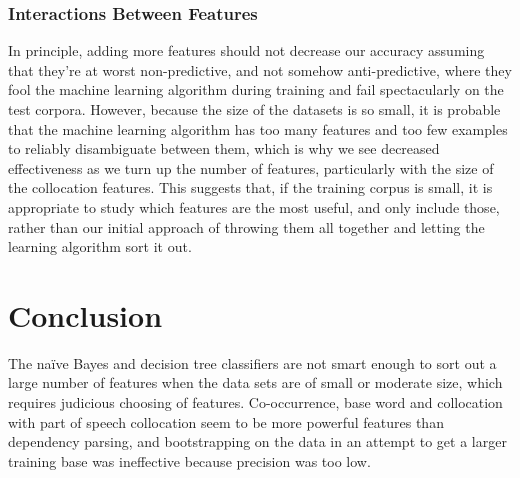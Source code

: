 \documentclass{article}
\newcommand{\naive}{na\"ive}
\begin{document}
\subsubsection{Interactions Between Features}

In principle, adding more features should not decrease our accuracy assuming
that they're at worst non-predictive, and not somehow anti-predictive, where
they fool the machine learning algorithm during training and fail spectacularly
on the test corpora.  However, because the size of the datasets is so small, it
is probable that the machine learning algorithm has too many features and too
few examples to reliably disambiguate between them, which is why we see
decreased effectiveness as we turn up the number of features, particularly with
the size of the collocation features.  This suggests that, if the training
corpus is small, it is appropriate to study which features are the most useful,
and only include those, rather than our initial approach of throwing them all
together and letting the learning algorithm sort it out.


\section{Conclusion}

The \naive{} Bayes and decision tree classifiers are not smart enough to sort out
a large number of features when the data sets are of small or moderate size,
which requires judicious choosing of features.  Co-occurrence, base word and
collocation with part of speech collocation seem to be more powerful features
than dependency parsing, and bootstrapping on the data in an attempt to get a
larger training base was ineffective because precision was too low.
\end{document}
